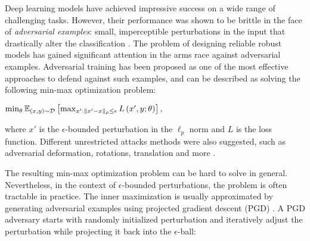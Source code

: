 Deep learning models have achieved impressive success on a 
wide
range of challenging tasks. However, their performance was shown to be brittle 
in the face of
\textit{adversarial examples}: small,
imperceptible
perturbations in the input that 
drastically alter the classification
\citep{carlini2017adversarial, carlini2017towards, goodfellow2014explaining, kurakin2016adversarial, moosavi2016deepfool, szegedy2013intriguing, tramer2017ensemble, dong2018boosting, tabacof2016exploring, xie2019improving, rony2019decoupling}.
The problem of
designing reliable robust models has gained significant attention in the arms race against adversarial examples.
Adversarial training \citep{szegedy2013intriguing, goodfellow2014explaining, madry2017towards, zhang2019theoretically} has been proposed as one of the most effective approaches to defend against such examples, and can be described as solving the following min-max optimization problem:

\begin{center}
$\min_{\theta}\mathbb{E}_{(x,y)\sim \mathcal{D}}\left[ \max_{x':\Vert x'-x \Vert_p\leq \epsilon}L\left( x',y;\theta \right) \right],$
\end{center}

where $x'$ is the $\epsilon$-bounded perturbation in the $\ell_p$ norm
and $L$ is the loss function.
Different unrestricted attacks methods were also suggested, such as adversarial deformation, rotations, translation and more \citep{brown2018unrestricted, engstrom2018rotation, xiao2018spatially, alaifari2018adef, gilmer2018motivating}.

The resulting min-max optimization problem can be hard to solve in general. Nevertheless, in the context of $\epsilon$-bounded perturbations, the problem is often tractable in practice. The inner maximization is usually approximated by generating adversarial examples using projected gradient descent (PGD) \citep{kurakin2016atscale, madry2017towards}. A PGD adversary starts with randomly initialized perturbation and iteratively adjust the perturbation while projecting it back into the $\epsilon$-ball:


